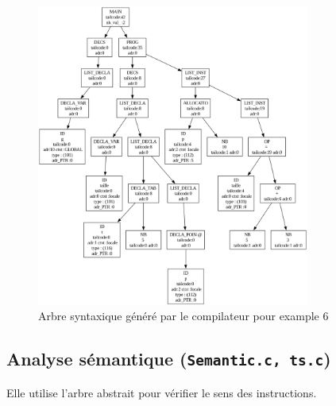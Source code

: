 \documentclass[a4paper,10pt]{article}
\begin{document}
\begin{figure}[H]
    \centering
    \includegraphics[width=0.8\textwidth]{asa.png}
    \caption{Arbre syntaxique généré par le compilateur pour example 6}
    \label{fig:asa_structure}
\end{figure}

\subsection*{Analyse sémantique (\texttt{Semantic.c, ts.c})}
Elle utilise l'arbre abstrait pour vérifier le sens des instructions.
\end{document}
